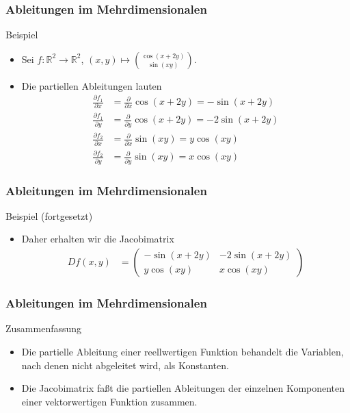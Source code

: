 \documentclass{beamer}
\newcommand\RR{\mathbb R}
\newcommand{\mytitle}{Ableitungen im Mehrdimensionalen}
\begin{document}
\begin{frame}\frametitle{\mytitle}
	\begin{block}{Beispiel}
		\begin{itemize}
			\item Sei $f:\RR^2\to\RR^2$, $(x,y)\mapsto\binom{\cos(x+2y)}{\sin(xy)}$.
			\item Die partiellen Ableitungen lauten
				\begin{align*}
					\frac{\partial f_1}{\partial x}&=\frac{\partial}{\partial x}\cos(x+2y)=-\sin(x+2y)\\
					\frac{\partial f_1}{\partial y}&=\frac{\partial}{\partial y}\cos(x+2y)=-2\sin(x+2y)\\
					\frac{\partial f_2}{\partial x}&=\frac{\partial}{\partial x}\sin(xy)=y\cos(xy)\\
					\frac{\partial f_2}{\partial y}&=\frac{\partial}{\partial y}\sin(xy)=x\cos(xy)
				\end{align*}
		\end{itemize}
	\end{block}
\end{frame}

\begin{frame}\frametitle{\mytitle}
	\begin{block}{Beispiel (fortgesetzt)}
		\begin{itemize}
			\item Daher erhalten wir die Jacobimatrix
				\begin{align*}
					Df(x,y)&=\begin{pmatrix}
						-\sin(x+2y)&-2\sin(x+2y)\\y\cos(xy)&x\cos(xy)
					\end{pmatrix}
				\end{align*}
		\end{itemize}
	\end{block}
\end{frame}

\begin{frame}\frametitle{\mytitle}
	\begin{block}{Zusammenfassung}
		\begin{itemize}
			\item Die partielle Ableitung einer reellwertigen Funktion behandelt die Variablen, nach denen nicht abgeleitet wird, als Konstanten.
			\item Die Jacobimatrix fa\ss t die partiellen Ableitungen der einzelnen Komponenten einer vektorwertigen Funktion zusammen.
		\end{itemize}
	\end{block}
\end{frame}
\end{document}
